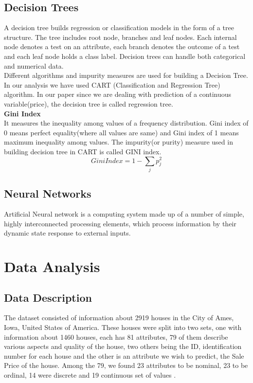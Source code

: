 \documentclass[fleqn,10pt]{SelfArx} %
\begin{document}
	\subsection{Decision Trees}
	A decision tree builds regression or classification models in the form of a tree structure. The tree includes root node, branches and leaf nodes. Each internal node denotes a test on an attribute, each branch denotes the outcome of a test and each leaf node holds a class label. Decision trees can handle both categorical and numerical data. \\
	Different algorithms and impurity measures are used for building a Decision Tree. In our analysis we have used CART (Classification and Regression Tree) algorithm. In our paper since we are dealing with prediction of a continuous  variable(price), the decision tree is called regression tree.\\
	\textbf{Gini Index}\\
	It measures the inequality among values of a frequency distribution. Gini index of 0 means perfect equality(where all values are same) and Gini index of 1 means maximum inequality among values. The impurity(or purity) measure used in building decision tree in CART is called GINI index.
	\[Gini Index = 1 - \sum_{j}p_j^2 \]
	
	\subsection{Neural Networks}
	Artificial Neural network is a computing system made up of a number of simple, highly interconnected processing elements, which process information by their dynamic state response to external inputs.
	
	\section{Data Analysis}
	
	\subsection{Data Description}
	The dataset consisted of information about 2919 houses in the City of Ames, Iowa, United States of America. These houses were split into two sets, one  with information about 1460 houses, each has 81 attributes, 79 of them describe various aspects and quality of the house, two others being the ID, identification number for each house and the other is an attribute we wish to predict, the Sale Price of the house. Among the 79, we found 23 attributes to be nominal, 23 to be ordinal, 14 were discrete and 19 continuous set of values \cite{dataset}.\\
	
\end{document}
